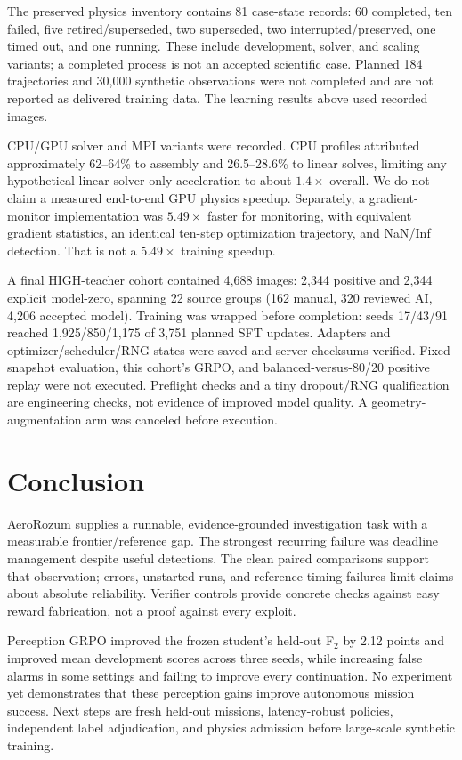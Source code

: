\documentclass[10pt,a4paper,twocolumn]{article}
\begin{document}
The preserved physics inventory contains 81 case-state records: 60 completed, ten failed, five retired/superseded, two superseded, two interrupted/preserved, one timed out, and one running. These include development, solver, and scaling variants; a completed process is not an accepted scientific case. Planned 184 trajectories and 30,000 synthetic observations were not completed and are not reported as delivered training data. The learning results above used recorded images.

CPU/GPU solver and MPI variants were recorded. CPU profiles attributed approximately 62--64\% to assembly and 26.5--28.6\% to linear solves, limiting any hypothetical linear-solver-only acceleration to about $1.4\times$ overall. We do not claim a measured end-to-end GPU physics speedup. Separately, a gradient-monitor implementation was $5.49\times$ faster for monitoring, with equivalent gradient statistics, an identical ten-step optimization trajectory, and NaN/Inf detection. That is not a $5.49\times$ training speedup.

A final HIGH-teacher cohort contained 4,688 images: 2,344 positive and 2,344 explicit model-zero, spanning 22 source groups (162 manual, 320 reviewed AI, 4,206 accepted model). Training was wrapped before completion: seeds 17/43/91 reached 1,925/850/1,175 of 3,751 planned SFT updates. Adapters and optimizer/scheduler/RNG states were saved and server checksums verified. Fixed-snapshot evaluation, this cohort's GRPO, and balanced-versus-80/20 positive replay were not executed. Preflight checks and a tiny dropout/RNG qualification are engineering checks, not evidence of improved model quality. A geometry-augmentation arm was canceled before execution.

\section{Conclusion}
AeroRozum supplies a runnable, evidence-grounded investigation task with a measurable frontier/reference gap. The strongest recurring failure was deadline management despite useful detections. The clean paired comparisons support that observation; errors, unstarted runs, and reference timing failures limit claims about absolute reliability. Verifier controls provide concrete checks against easy reward fabrication, not a proof against every exploit.

Perception GRPO improved the frozen student's held-out F$_2$ by 2.12 points and improved mean development scores across three seeds, while increasing false alarms in some settings and failing to improve every continuation. No experiment yet demonstrates that these perception gains improve autonomous mission success. Next steps are fresh held-out missions, latency-robust policies, independent label adjudication, and physics admission before large-scale synthetic training.
\end{document}

